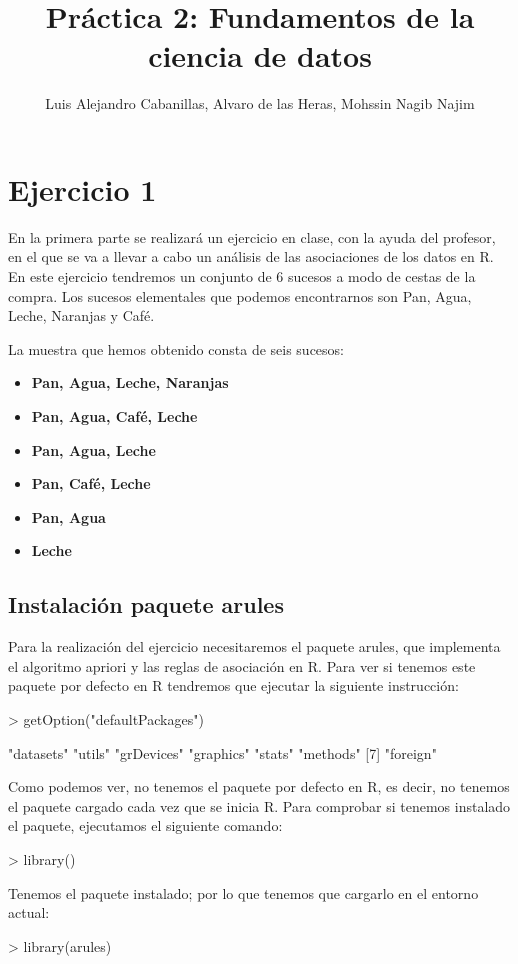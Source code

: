 \documentclass [a4paper] {article}
\title{\textbf{Práctica 2: Fundamentos de la ciencia de datos}}
\author{Luis Alejandro Cabanillas, Alvaro de las Heras, Mohssin Nagib Najim}
\begin{document}
\maketitle

\section{Ejercicio 1} En la primera parte se realizará un ejercicio en clase, con la ayuda del profesor, en el que se va a llevar a cabo un análisis
de las asociaciones de los datos en R. En este ejercicio tendremos un conjunto de 6 sucesos a modo de cestas de la compra. Los sucesos elementales que podemos
encontrarnos son {Pan}, {Agua}, {Leche}, {Naranjas} y {Café}.

La muestra que hemos obtenido consta de seis sucesos:
\begin{itemize}
	\item \textbf{{Pan, Agua, Leche, Naranjas}}
	\item \textbf{{Pan, Agua, Café, Leche}}
	\item \textbf{{Pan, Agua, Leche}}
        \item \textbf{{Pan, Café, Leche}}
        \item \textbf{{Pan, Agua}}
        \item \textbf{{Leche}}										 
\end{itemize}

\subsection{Instalación paquete arules} 
Para la realización del ejercicio necesitaremos el paquete arules, que implementa el algoritmo apriori y las reglas de asociación en R. 
Para ver si tenemos este paquete por defecto en R tendremos que ejecutar la siguiente instrucción:
\begin{Schunk}
\begin{Sinput}
> getOption("defaultPackages")
\end{Sinput}
\begin{Soutput}
[1] "datasets"  "utils"     "grDevices" "graphics"  "stats"     "methods"  
[7] "foreign"  
\end{Soutput}
\end{Schunk}

Como podemos ver, no tenemos el paquete por defecto en R, es decir, no tenemos el paquete cargado cada vez que se inicia R. Para comprobar
si tenemos instalado el paquete, ejecutamos el siguiente comando:
\begin{Schunk}
\begin{Sinput}
> library()
\end{Sinput}
\end{Schunk}
Tenemos el paquete instalado; por lo que tenemos que cargarlo en el entorno actual:
\begin{Schunk}
\begin{Sinput}
> library(arules)
\end{Sinput}
\end{Schunk}
\end{document}
